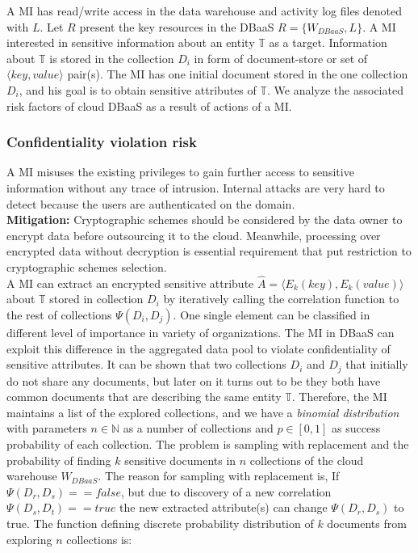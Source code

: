 \noindent A MI has read/write access in the data warehouse and activity log files denoted with $L$. Let $R$ present the key resources in the DBaaS $R=\{W_{DBaaS}, L\}$. A MI interested in sensitive information about an entity $\mathbb{T}$ as a target. Information about $\mathbb{T}$ is stored in the collection $D_i$ in form of document-store or set of $\langle key, value \rangle$ pair(s). The MI has one initial document stored in the one collection $D_i$, and his goal is to obtain sensitive attributes of $\mathbb{T}$. We analyze the associated risk factors of cloud DBaaS as a result of actions of a MI.\\


\subsubsection*{Confidentiality violation risk}
\label{subsec:ConfidentialityViolation}
A MI misuses the existing privileges to gain further access to sensitive information without any trace of intrusion. Internal attacks are very hard to detect because the users are authenticated on the domain.\\
\textbf{Mitigation:} Cryptographic schemes should be considered by the data owner to encrypt data before outsourcing it to the cloud. Meanwhile, processing over encrypted data without decryption is essential requirement that put restriction to cryptographic schemes selection.\\

\noindent A MI can extract an encrypted sensitive attribute $\hat{A}=\langle E_k(key), E_k(value) \rangle$ about $\mathbb{T}$ stored in collection $D_i$ by iteratively calling the correlation function to the rest of collections $\Psi (D_i, D_j)$. One single element can be classified in different level of importance in variety of organizations. The MI in DBaaS can exploit this  difference in the aggregated data pool to violate confidentiality of sensitive attributes. It can be shown that two collections $D_i$ and $D_j$ that initially do not share any documents, but later on it turns out to be they both have common documents that are describing the same entity $\mathbb{T}$. Therefore, the MI maintains a list of the explored collections, and we have a \emph{binomial distribution} with parameters $n \in \mathbb{N}$ as a number of collections and $p \in [0,1]$ as success probability of each collection. The problem is sampling with replacement and the probability of finding $k$ sensitive documents in $n$ collections of the cloud warehouse $W_{DBaaS}$. The reason for sampling with replacement is, If $\Psi(D_r, D_s)==false$, but due to discovery of a new correlation $\Psi(D_s, D_t)==true$ the new extracted attribute(s) can change $\Psi(D_r, D_s)$ to true. The function defining discrete probability distribution of $k$ documents from exploring $n$ collections is:   

